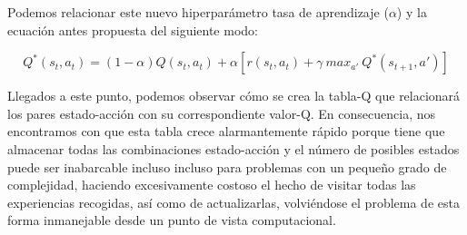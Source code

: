 Podemos relacionar este nuevo hiperparámetro tasa de aprendizaje ($\alpha$) y la ecuación antes propuesta del siguiente modo:

$$Q^*(s_{t}, a_{t}) = (1-\alpha ) Q(s_{t}, a_{t}) + \alpha [r(s_{t}, a_{t}) + \gamma\ max_{a'}\ Q^*(s_{t+1}, a')]$$

Llegados a este punto, podemos observar cómo se crea la tabla-Q que relacionará los pares estado-acción con su correspondiente valor-Q. En consecuencia, nos encontramos con que esta tabla crece alarmantemente rápido porque tiene que almacenar todas las combinaciones estado-acción y el número de posibles estados puede ser inabarcable incluso incluso para problemas con un pequeño grado de complejidad, haciendo excesivamente costoso el hecho de visitar todas las experiencias recogidas, así como de actualizarlas, volviéndose el problema de esta forma inmanejable desde un punto de vista computacional.